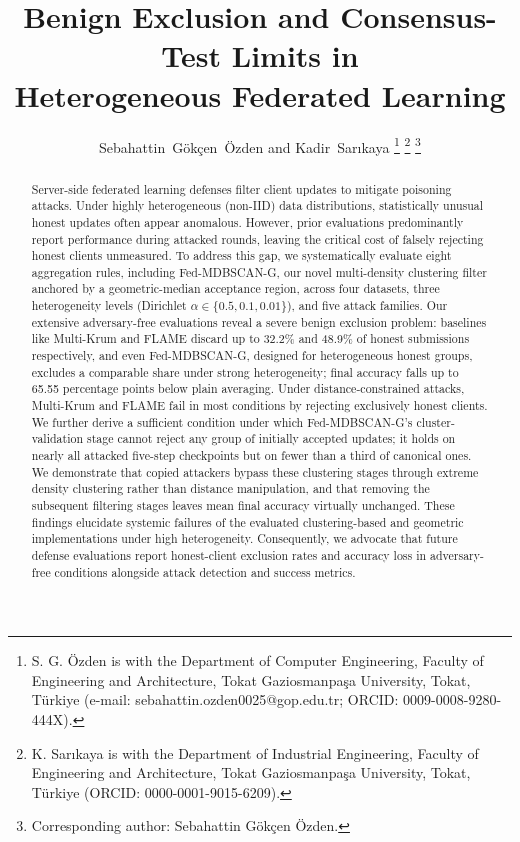 \documentclass[journal]{IEEEtran}
\begin{document}
\title{Benign Exclusion and Consensus-Test Limits in\\Heterogeneous Federated Learning}

\author{Sebahattin~G\"ok\c{c}en~\"Ozden and Kadir~Sar{\i}kaya%
\thanks{S. G. \"Ozden is with the Department of Computer Engineering, Faculty of Engineering and Architecture, Tokat Gaziosmanpa\c{s}a University, Tokat, T\"urkiye (e-mail: sebahattin.ozden0025@gop.edu.tr; ORCID: \mbox{0009-0008-9280-444X}).}%
\thanks{K. Sar{\i}kaya is with the Department of Industrial Engineering, Faculty of Engineering and Architecture, Tokat Gaziosmanpa\c{s}a University, Tokat, T\"urkiye (ORCID: \mbox{0000-0001-9015-6209}).}%
\thanks{Corresponding author: Sebahattin G\"ok\c{c}en \"Ozden.}}

\maketitle

\begin{abstract}
Server-side federated learning defenses filter client updates to mitigate poisoning attacks. Under highly heterogeneous (non-IID) data distributions, statistically unusual honest updates often appear anomalous. However, prior evaluations predominantly report performance during attacked rounds, leaving the critical cost of falsely rejecting honest clients unmeasured. To address this gap, we systematically evaluate eight aggregation rules, including Fed-MDBSCAN-G, our novel multi-density clustering filter anchored by a geometric-median acceptance region, across four datasets, three heterogeneity levels (Dirichlet $\alpha \in \{0.5, 0.1, 0.01\}$), and five attack families. Our extensive adversary-free evaluations reveal a severe benign exclusion problem: baselines like Multi-Krum and FLAME discard up to 32.2\% and 48.9\% of honest submissions respectively, and even Fed-MDBSCAN-G, designed for heterogeneous honest groups, excludes a comparable share under strong heterogeneity; final accuracy falls up to 65.55 percentage points below plain averaging. Under distance-constrained attacks, Multi-Krum and FLAME fail in most conditions by rejecting exclusively honest clients. We further derive a sufficient condition under which Fed-MDBSCAN-G's cluster-validation stage cannot reject any group of initially accepted updates; it holds on nearly all attacked five-step checkpoints but on fewer than a third of canonical ones. We demonstrate that copied attackers bypass these clustering stages through extreme density clustering rather than distance manipulation, and that removing the subsequent filtering stages leaves mean final accuracy virtually unchanged. These findings elucidate systemic failures of the evaluated clustering-based and geometric implementations under high heterogeneity. Consequently, we advocate that future defense evaluations report honest-client exclusion rates and accuracy loss in adversary-free conditions alongside attack detection and success metrics.
\end{abstract}
\end{document}
